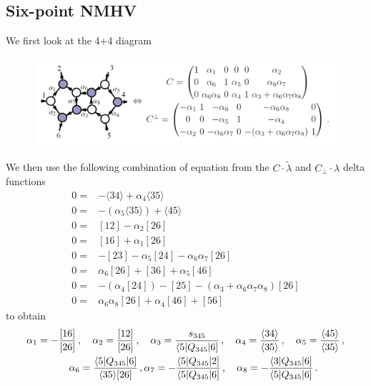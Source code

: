 \documentclass[letter,11pt]{article}
\newcommand{\ab}[1]{\langle #1 \rangle}
\newcommand{\sqb}[1]{[ #1 ]}
\newcommand{\aMs}[3]{\langle #1|#2|#3]}  		%
\newcommand{\sab}[1]{s_{#1}}
\newcommand{\twhite}[1]{\textcolor{white}{#1}}
\begin{document}
\subsection*{Six-point NMHV}
We first look at the 4+4 diagram
\begin{figure}[H]
	\centering
	\includegraphics[width=0.9\linewidth]{4+4}
	\caption[4+4]{}
	\label{fig:44}
\end{figure}
We then use the following combination of equation from the $C\cdot\tilde \lambda$ and $C_\perp\cdot \lambda$ delta functions
\begin{equation}
	\begin{aligned}
0=&-\langle 3 4 \rangle + \alpha_{4} \langle 3 5 \rangle
\\
0=&-(\alpha_{5} \langle 3 5 \rangle) + \langle 4 5 \rangle
\\
0=&\left[ 1 2 \right] - \alpha_{2} \left[ 2 6 \right]
\\
0=&\left[ 1 6 \right] + \alpha_{1} \left[ 2 6 \right]
\\
0=&-\left[ 2 3 \right] - \alpha_{5} \left[ 2 4 \right] - \alpha_{6} \alpha_{7} \left[ 2 6 \right]
\\
0=&\alpha_{6} \left[ 2 6 \right] + \left[ 3 6 \right] + \alpha_{5} \left[ 4 6 \right]
\\
0=&-(\alpha_{4} \left[ 2 4 \right]) - \left[ 2 5 \right] - (\alpha_{3} + \alpha_{6} \alpha_{7} \alpha_{8}) \left[ 2 6 \right]
\\
0=&\alpha_{6} \alpha_{8} \left[ 2 6 \right] + \alpha_{4} \left[ 4 6 \right] + \left[ 5 6 \right]
	\end{aligned}
\end{equation}
to obtain
\begin{align*}
	& \alpha_1 = -\frac{[16]}{[26]}\,, \quad \alpha_2 = \frac{[12]}{[26]}\,, \quad \alpha_3 = \frac{\sab{345}}{\aMs{5}{Q_{345}}{6}}\,, \quad \alpha_4 = \frac{\ab{34}}{\ab{35}}\,, \quad
	\alpha_5 = \frac{\ab{45}}{\ab{35}}\,, \\ 
	& \twhite{.}\hspace{1.4cm} 
	\alpha_6 = \frac{\aMs{5}{Q_{345}}{6}}{\ab{35}\sqb{26}}\,, \alpha_7 = -\frac{\aMs{5}{Q_{345}}{2}}{\aMs{5}{Q_{345}}{6}}\,,\quad
	\alpha_8 = - \frac{\aMs{3}{Q_{345}}{6}}{\aMs{5}{Q_{345}}{6}}\,.
\end{align*}
\end{document}
